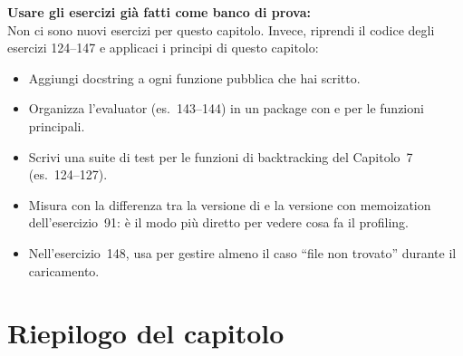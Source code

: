 \begin{workbook}
\textbf{Usare gli esercizi già fatti come banco di prova:}\\[4pt]
Non ci sono nuovi esercizi per questo capitolo.
Invece, riprendi il codice degli esercizi 124--147
e applicaci i principi di questo capitolo:

\begin{itemize}
  \item Aggiungi docstring a ogni funzione pubblica che hai scritto.
  \item Organizza l'evaluator (es.~143--144) in un package
        con  e  per le funzioni principali.
  \item Scrivi una suite di test  per le funzioni
        di backtracking del Capitolo~7 (es.~124--127).
  \item Misura con  la differenza tra la versione
        di  e la versione con memoization
        dell'esercizio~91: è il modo più diretto per vedere
        cosa fa il profiling.
  \item Nell'esercizio~148, usa  per gestire
        almeno il caso ``file non trovato'' durante il caricamento.
\end{itemize}
\end{workbook}

\section*{Riepilogo del capitolo}

